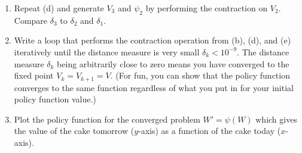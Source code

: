 \begin{problem}
\begin{enumerate}
   \item Repeat (d) and generate $V_3$ and $\psi_2$ by performing the contraction on $V_2$. Compare $\delta_3$ to $\delta_2$ and $\delta_1$.

   \item Write a loop that performs the contraction operation from (b), (d), and (e) iteratively until the distance measure is very small $\delta_k < 10^{-9}$.  The distance measure $\delta_k$ being arbitrarily close to zero means you have converged to the fixed point $V_k = V_{k+1} = V$. (For fun, you can show that the policy function converges to the same function regardless of what you put in for your initial policy function value.)

   \item Plot the policy function for the converged problem $W' = \psi\left(W\right)$ which gives the value of the cake tomorrow ($y$-axis) as a function of the cake today ($x$-axis).

\end{enumerate}
\end{problem} 